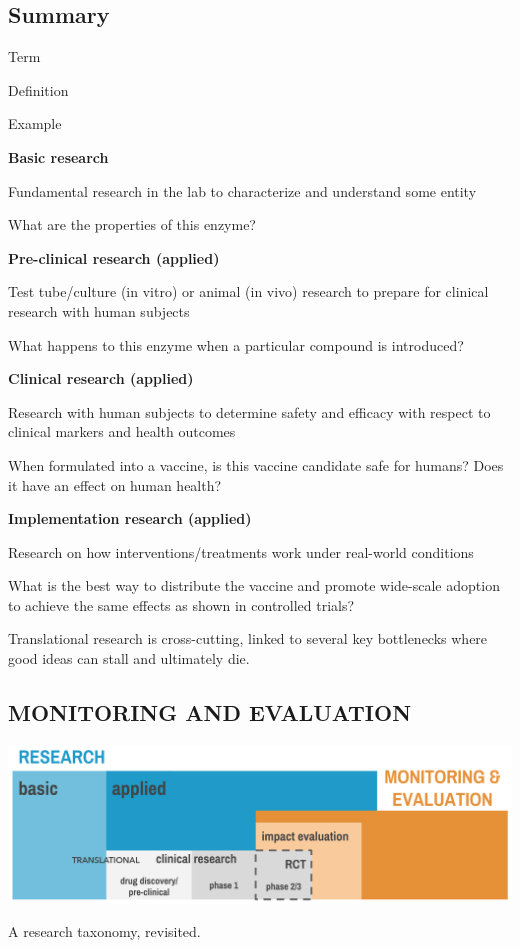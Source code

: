 \documentclass[justified,twoside,symmetric,]{tufte-book}
\let\subsubsection\subsection
\begin{document}
\hypertarget{summary}{%
\subsubsection*{Summary}\label{summary}}

Term

Definition

Example

\textbf{Basic research}

Fundamental research in the lab to characterize and understand some entity

What are the properties of this enzyme?

\textbf{Pre-clinical research (applied)}

Test tube/culture (in vitro) or animal (in vivo) research to prepare for clinical research with human subjects

What happens to this enzyme when a particular compound is introduced?

\textbf{Clinical research (applied)}

Research with human subjects to determine safety and efficacy with respect to clinical markers and health outcomes

When formulated into a vaccine, is this vaccine candidate safe for humans? Does it have an effect on human health?

\textbf{Implementation research (applied)}

Research on how interventions/treatments work under real-world conditions

What is the best way to distribute the vaccine and promote wide-scale adoption to achieve the same effects as shown in controlled trials?

Translational research is cross-cutting, linked to several key bottlenecks where good ideas can stall and ultimately die.

\hypertarget{monitoring-and-evaluation}{%
\subsection{MONITORING AND EVALUATION}\label{monitoring-and-evaluation}}

\begin{marginfigure}
\includegraphics{images/basicapplied} \caption[A research taxonomy, revisited]{A research taxonomy, revisited.}\label{fig:basicapplied2}
\end{marginfigure}
\end{document}
